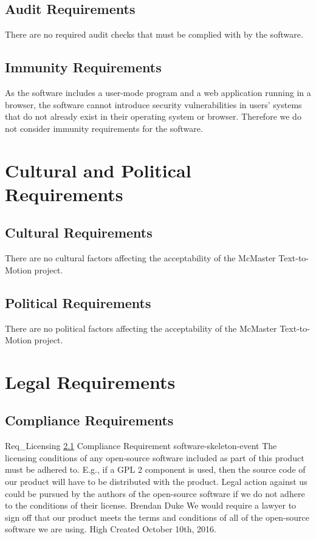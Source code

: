 \documentclass{scrreprt}
\begin{document}
\subsection{Audit Requirements}

There are no required audit checks that must be complied with by the software.

\subsection{Immunity Requirements}

As the software includes a user-mode program and a web application running in a
browser, the software cannot introduce security vulnerabilities in users'
systems that do not already exist in their operating system or browser.
Therefore we do not consider immunity requirements for the software.

\section{Cultural and Political Requirements}

\subsection{Cultural Requirements}

There are no cultural factors affecting the acceptability of the McMaster
Text-to-Motion project.

\subsection{Political Requirements}

There are no political factors affecting the acceptability of the McMaster
Text-to-Motion project.

\section{Legal Requirements}

\subsection{Compliance Requirements}
\label{req-compliance}

\requirement
{Req_Licensing}
{\ref{req-compliance} Compliance Requirement}
{software-skeleton-event}
{The licensing conditions of any open-source software included as part of this
product must be adhered to. E.g., if a GPL 2 component is used, then the source
code of our product will have to be distributed with the product.}
{Legal action against us could be pursued by the authors of the open-source
software if we do not adhere to the conditions of their license.}
{Brendan Duke}
{We would require a lawyer to sign off that our product meets the terms and
conditions of all of the open-source software we are using.}
{High}
{Created October 10th, 2016.}
\end{document}
